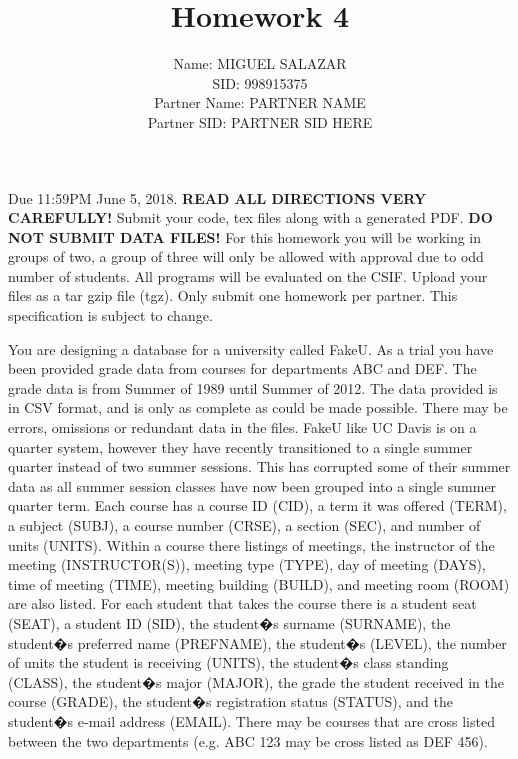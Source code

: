 \documentclass{article}
\begin{document}
\title{Homework 4}
\author{Name: MIGUEL SALAZAR\\SID: 998915375\\Partner Name: PARTNER NAME\\Partner SID: PARTNER SID HERE}

\maketitle

Due 11:59PM June 5, 2018. {\bf READ ALL DIRECTIONS VERY CAREFULLY!} 
Submit your code, tex files along with a generated PDF. {\bf DO NOT SUBMIT DATA FILES!} 
For this homework you will be working in groups of two, a group of three will only be allowed with approval due to odd number of students. 
All programs will be evaluated on the CSIF. Upload your files as a tar gzip file (tgz). Only submit one homework per partner. This specification is subject to change.

You are designing a database for a university called FakeU. As a trial you have been provided grade data from courses for departments ABC and DEF. 
The grade data is from Summer of 1989 until Summer of 2012. The data provided is in CSV format, and is only as complete as could be made possible. 
There may be errors, omissions or redundant data in the files. 
FakeU like UC Davis is on a quarter system, however they have recently transitioned to a single summer quarter instead of two summer sessions. 
This has corrupted some of their summer data as all summer session classes have now been grouped into a single summer quarter term. 
Each course has a course ID (CID), a term it was offered (TERM), a subject (SUBJ), a course number (CRSE), a section (SEC), and number of units (UNITS). 
Within a course there listings of meetings, the instructor of the meeting (INSTRUCTOR(S)), meeting type (TYPE), day of meeting (DAYS), time of meeting (TIME), meeting building (BUILD), and meeting room (ROOM) are also listed. For each student that takes the course there is a student seat (SEAT), a student ID (SID), the student�s surname (SURNAME), the student�s preferred name (PREFNAME), the student�s (LEVEL), the number of units the student is receiving (UNITS), the student�s class standing (CLASS), the student�s major (MAJOR), the grade the student received in the course (GRADE), the student�s registration status (STATUS), and the student�s e-mail address (EMAIL).
There may be courses that are cross listed between the two departments (e.g. ABC 123 may be cross listed as DEF 456).
\end{document}
